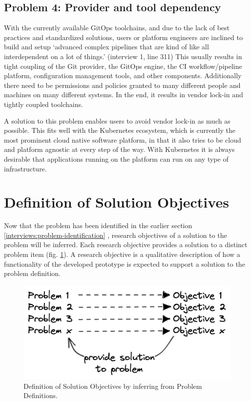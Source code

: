 \subsection{Problem 4: Provider and tool dependency}
\label{problem4}

With the currently available GitOps toolchains,
and due to the lack of best practices and standardized solutions,
users or platform engineers are inclined to build
and setup
\enquote*{advanced complex pipelines that are kind of like all interdependent on a lot of things.}
(interview 1, line 311)
This usually results in tight coupling of the Git provider, the GitOps engine, the CI workflow/pipeline platform,
configuration management tools, and other components.
Additionally there need to be permissions and policies granted to many different people and
machines on many different systems.
In the end, it results in vendor lock-in and tightly coupled toolchains.

A solution to this problem enables users to avoid vendor lock-in as much as possible.
This fits well with the Kubernetes ecosystem, which is currently the most prominent
cloud native software platform,
in that it also tries to be cloud and platform agnostic at every step of the way.
With Kubernetes it is always desirable that applications running on the platform can
run on any type of infrastructure.











\section{Definition of Solution Objectives}\label{interviews:definitionSolutionObjectives}

Now that the problem has been identified in the earlier section
\ref{interviews:problem-identification} ,
research objectives of a solution to the problem will be inferred.
Each research objective provides a solution to a distinct problem item
(fig. \ref{fig:from-problem-to-objective-visualized}).
A research objective is a qualitative description of how a functionality
of the developed prototype is expected to support a solution to the problem definition.

\begin{figure}[h]
	\centering
	\includegraphics[width=0.55\linewidth]{assets/from-problem-to-objective-visualized.png}
	\caption{Definition of Solution Objectives by inferring from Problem Definitions.
	}
	\label{fig:from-problem-to-objective-visualized}	
\end{figure}

